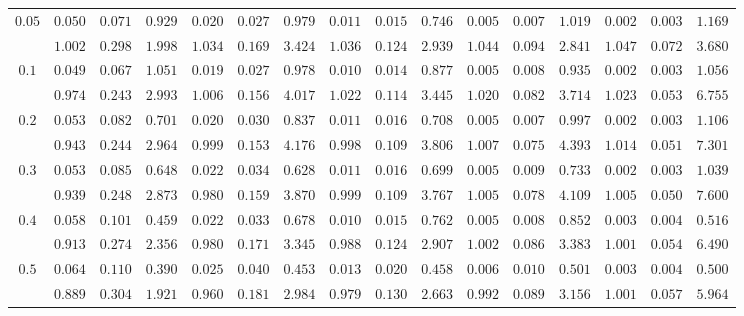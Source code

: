 \begin{table}[ht]
\begin{center}
\begin{tabular}{|c|ccc|ccc|ccc|ccc|ccc|}
\hline 
$0.05$ & $ 0.050 $ & $ 0.071 $ & $ 0.929 $ & $ 0.020 $ & $ 0.027 $ & $ 0.979 $ & $ 0.011 $ & $ 0.015 $ & $ 0.746 $ & $ 0.005 $ & $ 0.007 $ & $ 1.019 $ & $ 0.002 $ & $ 0.003 $ & $ 1.169 $\\ 
 & $ 1.002 $ & $ 0.298 $ & $ 1.998 $ & $ 1.034 $ & $ 0.169 $ & $ 3.424 $ & $ 1.036 $ & $ 0.124 $ & $ 2.939 $ & $ 1.044 $ & $ 0.094 $ & $ 2.841 $ & $ 1.047 $ & $ 0.072 $ & $ 3.680 $\\ 
\hline 
$0.1$ & $ 0.049 $ & $ 0.067 $ & $ 1.051 $ & $ 0.019 $ & $ 0.027 $ & $ 0.978 $ & $ 0.010 $ & $ 0.014 $ & $ 0.877 $ & $ 0.005 $ & $ 0.008 $ & $ 0.935 $ & $ 0.002 $ & $ 0.003 $ & $ 1.056 $\\ 
 & $ 0.974 $ & $ 0.243 $ & $ 2.993 $ & $ 1.006 $ & $ 0.156 $ & $ 4.017 $ & $ 1.022 $ & $ 0.114 $ & $ 3.445 $ & $ 1.020 $ & $ 0.082 $ & $ 3.714 $ & $ 1.023 $ & $ 0.053 $ & $ 6.755 $\\ 
\hline 
$0.2$ & $ 0.053 $ & $ 0.082 $ & $ 0.701 $ & $ 0.020 $ & $ 0.030 $ & $ 0.837 $ & $ 0.011 $ & $ 0.016 $ & $ 0.708 $ & $ 0.005 $ & $ 0.007 $ & $ 0.997 $ & $ 0.002 $ & $ 0.003 $ & $ 1.106 $\\ 
 & $ 0.943 $ & $ 0.244 $ & $ 2.964 $ & $ 0.999 $ & $ 0.153 $ & $ 4.176 $ & $ 0.998 $ & $ 0.109 $ & $ 3.806 $ & $ 1.007 $ & $ 0.075 $ & $ 4.393 $ & $ 1.014 $ & $ 0.051 $ & $ 7.301 $\\ 
\hline 
$0.3$ & $ 0.053 $ & $ 0.085 $ & $ 0.648 $ & $ 0.022 $ & $ 0.034 $ & $ 0.628 $ & $ 0.011 $ & $ 0.016 $ & $ 0.699 $ & $ 0.005 $ & $ 0.009 $ & $ 0.733 $ & $ 0.002 $ & $ 0.003 $ & $ 1.039 $\\ 
 & $ 0.939 $ & $ 0.248 $ & $ 2.873 $ & $ 0.980 $ & $ 0.159 $ & $ 3.870 $ & $ 0.999 $ & $ 0.109 $ & $ 3.767 $ & $ 1.005 $ & $ 0.078 $ & $ 4.109 $ & $ 1.005 $ & $ 0.050 $ & $ 7.600 $\\ 
\hline 
$0.4$ & $ 0.058 $ & $ 0.101 $ & $ 0.459 $ & $ 0.022 $ & $ 0.033 $ & $ 0.678 $ & $ 0.010 $ & $ 0.015 $ & $ 0.762 $ & $ 0.005 $ & $ 0.008 $ & $ 0.852 $ & $ 0.003 $ & $ 0.004 $ & $ 0.516 $\\ 
 & $ 0.913 $ & $ 0.274 $ & $ 2.356 $ & $ 0.980 $ & $ 0.171 $ & $ 3.345 $ & $ 0.988 $ & $ 0.124 $ & $ 2.907 $ & $ 1.002 $ & $ 0.086 $ & $ 3.383 $ & $ 1.001 $ & $ 0.054 $ & $ 6.490 $\\ 
\hline 
$0.5$ & $ 0.064 $ & $ 0.110 $ & $ 0.390 $ & $ 0.025 $ & $ 0.040 $ & $ 0.453 $ & $ 0.013 $ & $ 0.020 $ & $ 0.458 $ & $ 0.006 $ & $ 0.010 $ & $ 0.501 $ & $ 0.003 $ & $ 0.004 $ & $ 0.500 $\\ 
 & $ 0.889 $ & $ 0.304 $ & $ 1.921 $ & $ 0.960 $ & $ 0.181 $ & $ 2.984 $ & $ 0.979 $ & $ 0.130 $ & $ 2.663 $ & $ 0.992 $ & $ 0.089 $ & $ 3.156 $ & $ 1.001 $ & $ 0.057 $ & $ 5.964 $\\ 

\end{tabular}
\end{center}
\end{table}
